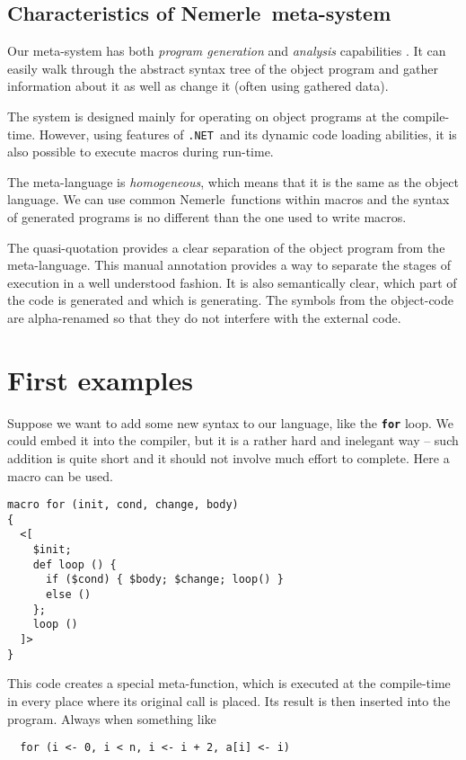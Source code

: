 \documentclass{llncs}
\newcommand{\net}[0]{{\tt .NET}}
\newcommand{\nem}[0]{Nemerle}
\newcommand{\kw}[1]{{\tt \bf #1}}
\begin{document}
\subsection{Characteristics of \nem\ meta-system}
Our meta-system has both \emph{program generation} and \emph{analysis}
capabilities \cite{Meta:Accomplishments}. It can easily walk through the abstract 
syntax tree of the object program and gather information about it as well 
as change it (often using gathered data).

The system is designed mainly for operating on object programs at the compile-time.
However, using features of \net\ and its dynamic code loading abilities, it is
also possible to execute macros during run-time. 

The meta-language is \emph{homogeneous}, which means that it is the same as the 
object language. We can use common \nem\ functions within macros and the syntax 
of generated programs is no different than the one used to write macros.

The quasi-quotation provides a clear separation of the object program from 
the meta-language. This manual annotation provides a way to separate the stages
of execution in a well understood fashion. It is also semantically clear, which 
part of the code is generated and which is generating. The symbols from the 
object-code are alpha-renamed so that they do not interfere with the external code. 

\section{First examples}
Suppose we want to add some new syntax to our language, like the \kw{for} loop.
We could embed it into the compiler, but it is a rather hard and inelegant way -- such 
addition is quite short and it should not involve much effort to complete. 
Here a macro can be used.

\begin{verbatim}
macro for (init, cond, change, body) 
{
  <[ 
    $init;
    def loop () {
      if ($cond) { $body; $change; loop() } 
      else () 
    }; 
    loop ()
  ]>
}
\end{verbatim}

This code creates a special meta-function, which is executed at the compile-time
in every place where its original call is placed. Its result is then inserted 
into the program. Always when something like

\begin{verbatim}
  for (i <- 0, i < n, i <- i + 2, a[i] <- i)
\end{verbatim}
\end{document}
